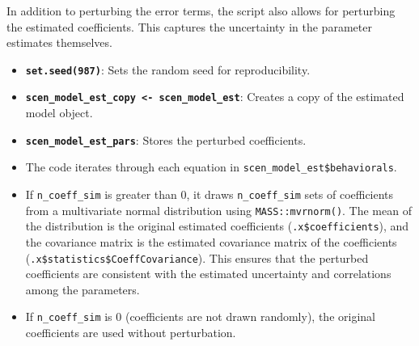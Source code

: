 \documentclass[
  letterpaper,
  DIV=11,
  numbers=noendperiod]{scrreport}
\newenvironment{Shaded}{\begin{snugshade}}{\end{snugshade}}
\newcommand{\AttributeTok}[1]{\textcolor[rgb]{0.40,0.45,0.13}{#1}}
\newcommand{\CommentTok}[1]{\textcolor[rgb]{0.37,0.37,0.37}{#1}}
\newcommand{\ControlFlowTok}[1]{\textcolor[rgb]{0.00,0.23,0.31}{\textbf{#1}}}
\newcommand{\DecValTok}[1]{\textcolor[rgb]{0.68,0.00,0.00}{#1}}
\newcommand{\FunctionTok}[1]{\textcolor[rgb]{0.28,0.35,0.67}{#1}}
\newcommand{\NormalTok}[1]{\textcolor[rgb]{0.00,0.23,0.31}{#1}}
\newcommand{\OtherTok}[1]{\textcolor[rgb]{0.00,0.23,0.31}{#1}}
\newcommand{\SpecialCharTok}[1]{\textcolor[rgb]{0.37,0.37,0.37}{#1}}
\providecommand{\tightlist}{%
  \setlength{\itemsep}{0pt}\setlength{\parskip}{0pt}}\usepackage{longtable,booktabs,array}
\begin{document}
In addition to perturbing the error terms, the script also allows for
perturbing the estimated coefficients. This captures the uncertainty in
the parameter estimates themselves.

\begin{Shaded}
\end{Shaded}

\begin{itemize}
\tightlist
\item
  \textbf{\texttt{set.seed(987)}}: Sets the random seed for
  reproducibility.
\item
  \textbf{\texttt{scen\_model\_est\_copy\ \textless{}-\ scen\_model\_est}}:
  Creates a copy of the estimated model object.
\item
  \textbf{\texttt{scen\_model\_est\_pars}}: Stores the perturbed
  coefficients.
\item
  The code iterates through each equation in
  \texttt{scen\_model\_est\$behaviorals}.
\item
  If \texttt{n\_coeff\_sim} is greater than 0, it draws
  \texttt{n\_coeff\_sim} sets of coefficients from a multivariate normal
  distribution using \texttt{MASS::mvrnorm()}. The mean of the
  distribution is the original estimated coefficients
  (\texttt{.x\$coefficients}), and the covariance matrix is the
  estimated covariance matrix of the coefficients
  (\texttt{.x\$statistics\$CoeffCovariance}). This ensures that the
  perturbed coefficients are consistent with the estimated uncertainty
  and correlations among the parameters.
\item
  If \texttt{n\_coeff\_sim} is 0 (coefficients are not drawn randomly),
  the original coefficients are used without perturbation.
\end{itemize}
\end{document}
